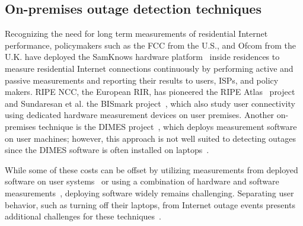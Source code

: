 



\subsection{On-premises outage detection techniques}

Recognizing the need for long term
measurements of residential Internet performance, policymakers such as
the FCC from the U.S., and Ofcom from the U.K. have deployed the SamKnows
hardware platform~\cite{samknows} inside residences to measure residential
Internet connections continuously by performing active and passive
measurements and reporting their results to users, ISPs, and
policy makers. RIPE NCC, the European RIR, has pioneered the RIPE Atlas~\cite{atlas} project and
Sundaresan et al. the BISmark project~\cite{bismark-main-bib}, which also study
user connectivity using dedicated hardware measurement devices on user premises. Another
on-premises technique is the DIMES project~\cite{netdimes}, which
deploys measurement software on user machines; however, this approach
is not well suited to detecting outages since the DIMES software is
often installed on laptops~\cite{dhcp-dimes}.

While some of these costs can be offset by utilizing measurements from
deployed software on user systems~\cite{netdimes, dhcp-dimes, Dasu:NSDI2013} or using a combination of hardware
and software measurements~\cite{IMC2014-Broadband-bischof}, deploying software widely remains
challenging. Separating user behavior, such as turning off their laptops, from
Internet outage events presents additional challenges for these techniques~\cite{dhcp-dimes}.


